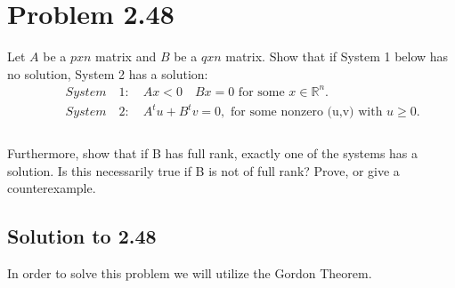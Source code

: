 \documentclass[12pt]{article}
\begin{document}
\section{Problem 2.48}
Let $A$ be a $p x n$ matrix and $B$ be a $q x n$ matrix. Show that if System 1 below has no solution, System 2 has a solution:\\
    \begin{align*}
        &\quad System \quad 1: \quad Ax < 0 \quad Bx =0 \text{ for some } x \in \mathbb{R}^n.\\
        &\quad System \quad 2: \quad A^tu + B^tv  = 0 ,\text{ for some  nonzero (u,v) with } u \geq 0.\\
    \end{align*} \\
Furthermore, show that if B has full rank, exactly one of the systems has a solution. Is this necessarily true if B is not of full rank? Prove, or give a counterexample.\\ 

\subsection{Solution to 2.48}
In order to solve this problem we will utilize the Gordon Theorem.\\ 
\end{document}
